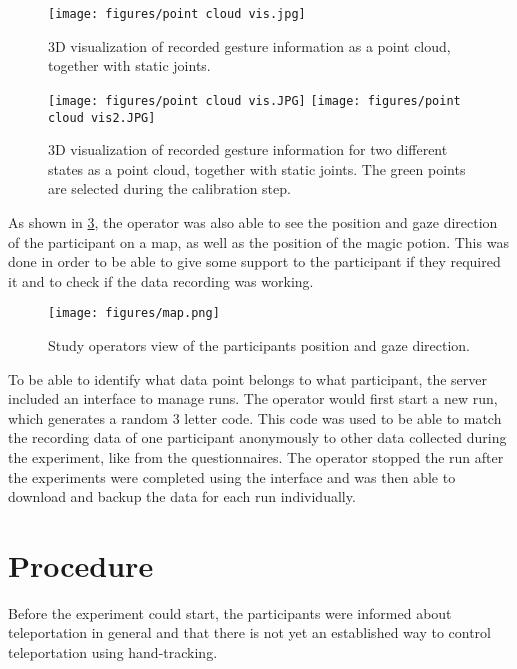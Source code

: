 \begin{figure}[!ht]
    \centering
    \texttt{[image: figures/point cloud vis.jpg]}
    \caption{3D visualization of recorded gesture information as a point cloud, together with static joints.}
    \label{fig:vis}
\end{figure}
\begin{figure}[!htb]
        \texttt{[image: figures/point cloud vis.JPG]}
    \endminipage\hfill
        \texttt{[image: figures/point cloud vis2.JPG]}
        \label{fig:vis}
    \endminipage\hfill
    \caption{3D visualization of recorded gesture information for two different states as a point cloud, together with static joints. The green points are selected during the calibration step.}
\end{figure}

As shown in \ref{fig:map}, the operator was also able to see the position and gaze direction of the participant on a map, as well as the position of the magic potion. This was done in order to be able to give some support to the participant if they required it and to check if the data recording was working. 

\begin{figure}[!ht]
    \centering
    \texttt{[image: figures/map.png]}
    \caption{Study operators view of the participants position and gaze direction.}
    \label{fig:map}
\end{figure}

To be able to identify what data point belongs to what participant, the server included an interface to manage runs. The operator would first start a new run, which generates a random 3 letter code. This code was used to be able to match the recording data of one participant anonymously to other data collected during the experiment, like from the questionnaires. The operator stopped the run after the experiments were completed using the interface and was then able to download and backup the data for each run individually.

\section{Procedure}
Before the experiment could start, the participants were informed about teleportation in general and that there is not yet an established way to control teleportation using hand-tracking.

